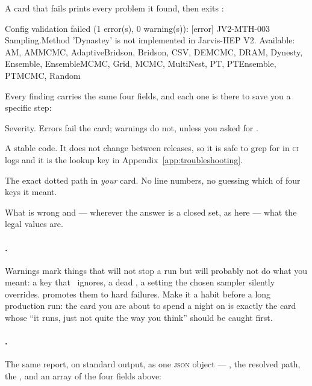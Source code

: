 A card that fails prints every problem it found, then exits :

\begin{terminal}
\begin{jout}
Config validation failed (1 error(s), 0 warning(s)):
  [error] JV2-MTH-003  Sampling.Method
          'Dynastey' is not implemented in Jarvis-HEP V2. Available: AM, AMMCMC,
          AdaptiveBridson, Bridson, CSV, DEMCMC, DRAM, Dynesty, Ensemble,
          EnsembleMCMC, Grid, MCMC, MultiNest, PT, PTEnsemble, PTMCMC, Random
\end{jout}
\end{terminal}

Every finding carries the same four fields, and each one is there to save you a specific
step:

\begin{keylist}
  \item[{[error] / [warning]}] Severity. Errors fail the card; warnings do not, unless
        you asked for .
  \item[JV2-MTH-003] A stable code. It does not change between releases, so it is safe
        to grep for in \textsc{ci} logs and it is the lookup key in
        Appendix~\ref{app:troubleshooting}.
  \item[Sampling.Method] The exact dotted path in \emph{your} card. No line numbers, no
        guessing which of four  keys it meant.
  \item[the message] What is wrong and --- wherever the answer is a closed set, as here
        --- what the legal values are.
\end{keylist}

\paragraph{.} Warnings mark things that will not stop a run but will
probably not do what you meant: a key that \Jtwo\ ignores, a dead
, a setting the chosen sampler silently overrides.
 promotes them to hard failures. Make it a habit before a long production
run: the card you are about to spend a night on is exactly the card whose ``it runs,
just not quite the way you think'' should be caught first.

\paragraph{.} The same report, on standard output, as one \textsc{json}
object --- , the resolved  path, the , and an
 array of the four fields above:

